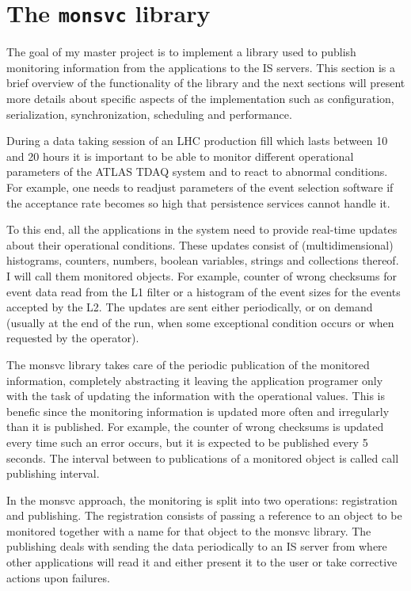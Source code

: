 \chapter{The {\tt monsvc} library} %
\label{Capitolul2}

The goal of my master project is to implement a library used to publish monitoring information from the applications to the IS servers. This section is a brief overview of the functionality of the library and the next sections will present more details about specific aspects of the implementation such as configuration, serialization, synchronization, scheduling and performance.

During a data taking session of an LHC production fill which lasts between 10 and 20 hours it is important to be able to monitor different operational parameters of the ATLAS TDAQ system and to react to abnormal conditions. For example, one needs to readjust parameters of the event selection software if the acceptance rate becomes so high that persistence services cannot handle it. 

To this end, all the applications in the system need to provide real-time updates about their operational conditions. These updates consist of (multidimensional) histograms, counters, numbers, boolean variables, strings and collections thereof. I will call them monitored objects. For example, counter of wrong checksums for event data read from the L1 filter or a histogram of the event sizes for the events accepted by the L2. The updates are sent either periodically, or on demand (usually at the end of the run, when some exceptional condition occurs or when requested by the operator).

The monsvc library takes care of the periodic publication of the monitored information, completely abstracting it leaving the application programer only with the task of updating the information with the operational values. This is benefic since the monitoring information is updated more often and irregularly than it is published. For example, the counter of wrong checksums is updated every time such an error occurs, but it is expected to be published every 5 seconds. The interval between to publications of a monitored object is called call publishing interval.

In the monsvc approach, the monitoring is split into two operations: registration and publishing. The registration consists of passing a reference to an object to be monitored together with a name for that object to the monsvc library. The publishing deals with sending the data periodically to an IS server from where other applications will read it and either present it to the user or take corrective actions upon failures. 

